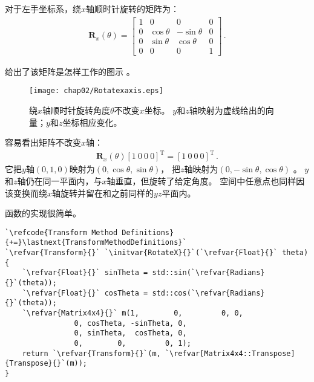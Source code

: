 对于左手坐标系，绕$x$轴顺时针旋转的矩阵为：
\begin{align*}
    \bm R_x(\theta)=\left[
        \begin{array}{cccc}
            1 & 0          & 0           & 0 \\
            0 & \cos\theta & -\sin\theta & 0 \\
            0 & \sin\theta & \cos\theta  & 0 \\
            0 & 0          & 0           & 1
        \end{array}
        \right]\, .
\end{align*}

给出了该矩阵是怎样工作的图示
。
\begin{figure}[htbp]
    \centering\texttt{[image: chap02/Rotatexaxis.eps]}
    \caption{绕$x$轴顺时针旋转角度$\theta$不改变$x$坐标。
        $y$和$z$轴映射为虚线给出的向量；$y$和$z$坐标相应变化。}
    \label{fig:2.11}
\end{figure}

容易看出矩阵不改变$x$轴：
\begin{align*}
    \bm R_x(\theta)[1\ 0\ 0\ 0]^\mathrm{T}=[1\ 0\ 0\ 0]^\mathrm{T}\, .
\end{align*}
它把$y$轴$(0,1,0)$映射为$(0,\cos\theta,\sin\theta)$，
把$z$轴映射为$(0,-\sin\theta,\cos\theta)$
。
$y$和$z$轴仍在同一平面内，与$x$轴垂直，但旋转了给定角度。
空间中任意点也同样因该变换而绕$x$轴旋转并留在和之前同样的$yz$平面内。

函数的实现很简单。
\begin{lstlisting}
`\refcode{Transform Method Definitions}{+=}\lastnext{TransformMethodDefinitions}`
`\refvar{Transform}{}` `\initvar{RotateX}{}`(`\refvar{Float}{}` theta) {
    `\refvar{Float}{}` sinTheta = std::sin(`\refvar{Radians}{}`(theta));
    `\refvar{Float}{}` cosTheta = std::cos(`\refvar{Radians}{}`(theta));
    `\refvar{Matrix4x4}{}` m(1,        0,         0, 0, 
                0, cosTheta, -sinTheta, 0,
                0, sinTheta,  cosTheta, 0,
                0,        0,         0, 1);
    return `\refvar{Transform}{}`(m, `\refvar[Matrix4x4::Transpose]{Transpose}{}`(m));
}
\end{lstlisting}

